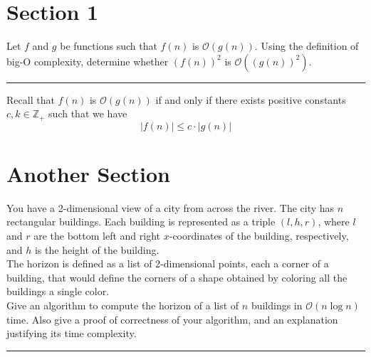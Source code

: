 \documentclass[paper=letter, fontsize=11pt]{scrartcl} %
\numberwithin{equation}{section} %
\numberwithin{figure}{section} %
\numberwithin{table}{section} %
\newcommand{\horrule}[1]{\rule{\linewidth}{#1}} %
\newcommand{\BigO}[1]{\mathcal{O}(#1)}
\newcommand{\abs}[1]{\left|#1\right|}
\begin{document}

\section{Section 1}

Let $f$ and $g$ be functions such that $f(n)$ is $\BigO{g(n)}$. Using the definition 
of big-O complexity, determine whether $(f(n))^2$ is $\BigO{(g(n))^2}$. \\
\horrule{0.5pt}
\vspace{1cm}

Recall that $f(n)$ is $\BigO{g(n)}$ if and only if there exists positive constants
$c, k \in \mathbb{Z}_+$ such that we have
\begin{equation}
    \abs{f(n)} \le c \cdot \abs{g(n)} \label{eqn:bigo}
\end{equation}


\section{Another Section}

You have a 2-dimensional view of a city from across the river. The city has $n$
rectangular buildings.  Each building is represented as a triple $(l, h, r)$,
where $l$ and $r$ are the bottom left and right $x$-coordinates of the
building, respectively, and $h$ is the height of the building. \\

The horizon is defined as a list of 2-dimensional points, each a corner of a
building, that would define the corners of a shape obtained by coloring all the
buildings a single color. \\

Give an algorithm to compute the horizon of a list of $n$ buildings in
$\BigO{n\log{n}}$ time.  Also give a proof of correctness of your algorithm,
and an explanation justifying its time complexity. \\
\horrule{0.5pt}
\vspace{1cm}
\end{document}
